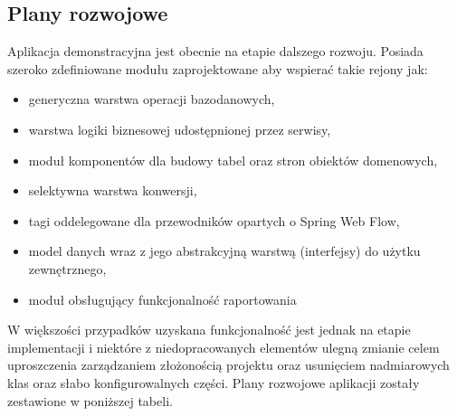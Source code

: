 	\subsection{Plany rozwojowe}
	Aplikacja demonstracyjna jest obecnie na etapie dalszego rozwoju. Posiada szeroko zdefiniowane modułu zaprojektowane aby wspierać takie
	rejony jak:
	\begin{itemize}
		\item generyczna warstwa operacji bazodanowych,
		\item warstwa logiki biznesowej udostępnionej przez serwisy,
		\item moduł komponentów dla budowy tabel oraz stron obiektów domenowych,
		\item selektywna warstwa konwersji,
		\item tagi oddelegowane dla przewodników opartych o Spring Web Flow,
		\item model danych wraz z jego abstrakcyjną warstwą (interfejsy) do użytku zewnętrznego,
		\item moduł obsługujący funkcjonalność raportowania 
	\end{itemize}
	W większości przypadków uzyskana funkcjonalność jest jednak na etapie implementacji i niektóre z niedopracowanych elementów 
	ulegną zmianie celem uproszczenia zarządzaniem złożonością projektu oraz usunięciem nadmiarowych klas oraz słabo
	konfigurowalnych części.
	Plany rozwojowe aplikacji zostały zestawione w poniższej tabeli.
